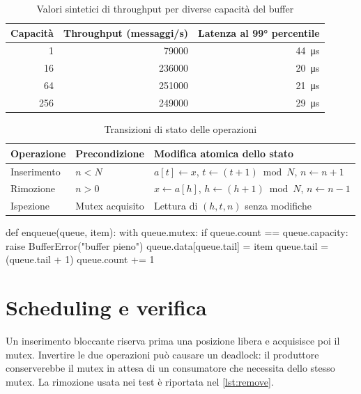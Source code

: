 \documentclass[italian]{../../unipd-notes}
\begin{document}
\begin{table}[H]
  \centering
  \caption{Valori sintetici di throughput per diverse capacità del buffer}\label{tab:throughput}
  \begin{tabular}{rrr}
    \toprule
    Capacità & Throughput (messaggi/s) & Latenza al 99° percentile \\
    \midrule
    1 & 79000 & \qty{44}{\micro\second} \\
    16 & 236000 & \qty{20}{\micro\second} \\
    64 & 251000 & \qty{21}{\micro\second} \\
    256 & 249000 & \qty{29}{\micro\second} \\
    \bottomrule
  \end{tabular}
\end{table}

\begin{table}[H]
  \centering
  \caption{Transizioni di stato delle operazioni}\label{tab:transitions}
  \begin{tabularx}{\textwidth}{lLL}
    \toprule
    Operazione & Precondizione & Modifica atomica dello stato \\
    \midrule
    Inserimento & $n<N$ & $a[t]\gets x$, $t\gets(t+1)\bmod N$, $n\gets n+1$ \\
    Rimozione & $n>0$ & $x\gets a[h]$, $h\gets(h+1)\bmod N$, $n\gets n-1$ \\
    Ispezione & Mutex acquisito & Lettura di $(h,t,n)$ senza modifiche \\
    \bottomrule
  \end{tabularx}
\end{table}

\begin{unipdcode}[language=Python,caption={Inserimento con controllo esplicito},label={lst:insert}]
def enqueue(queue, item):
    with queue.mutex:
        if queue.count == queue.capacity:
            raise BufferError("buffer pieno")
        queue.data[queue.tail] = item
        queue.tail = (queue.tail + 1) %
        queue.count += 1
\end{unipdcode}

\chapter{Scheduling e verifica}

Un inserimento bloccante riserva prima una posizione libera e acquisisce poi il mutex. Invertire le due operazioni può causare un deadlock: il produttore conserverebbe il mutex in attesa di un consumatore che necessita dello stesso mutex. La rimozione usata nei test è riportata nel \cref{lst:remove}.
\end{document}

